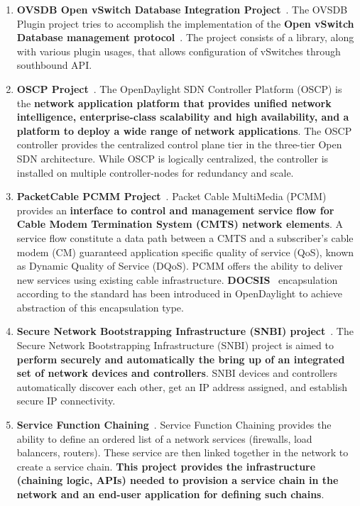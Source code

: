 \documentclass[a4paper, 12pt]{book}
\begin{document}
\begin{enumerate}
\item{\textbf{OVSDB Open vSwitch Database Integration Project}}~\cite{OpenDaylightWikiOpFlex}. The OVSDB Plugin project tries to accomplish the implementation of the \textbf{Open vSwitch Database management protocol}~\cite{OVSDB}. The project consists of a library, along with various plugin usages, that allows configuration of vSwitches through southbound API.
\item{\textbf{OSCP Project}}~\cite{OpenDaylightWikiOSCP}. The OpenDaylight SDN Controller Platform (OSCP) is the \textbf{network application platform that provides unified network intelligence, enterprise-class scalability and high availability, and a platform to deploy a wide range of network applications}. The OSCP controller provides the centralized control plane tier in the three-tier Open SDN architecture. While OSCP is logically centralized, the controller is installed on multiple controller-nodes for redundancy and scale.
\item{\textbf{PacketCable PCMM Project}}~\cite{OpenDaylightWikiPacketCable}. Packet Cable MultiMedia (PCMM)~\cite{PCMM} provides an \textbf{interface to control and management service flow for Cable Modem Termination System (CMTS) network elements}. A service flow constitute a data path between a CMTS and a subscriber's cable modem (CM) guaranteed application specific quality of service (QoS), known as Dynamic Quality of Service (DQoS). PCMM offers the ability to deliver new services using existing cable infrastructure. \textbf{DOCSIS}~\cite{DOCSIS} encapsulation according to the standard has been introduced in OpenDaylight to achieve abstraction of this encapsulation type.
\item{\textbf{Secure Network Bootstrapping Infrastructure (SNBI) project}}~\cite{OpenDaylightWikiSNBI}.  The Secure Network Bootstrapping Infrastructure (SNBI) project is aimed to \textbf{perform securely and automatically the bring up of an integrated set of network devices and controllers}. SNBI devices and controllers automatically discover each other, get an IP address assigned, and establish secure IP connectivity.
\item{\textbf{Service Function Chaining}}~\cite{OpenDaylightWikiSNMP}. Service Function Chaining provides the ability to define an ordered list of a network services (firewalls, load balancers, routers). These service are then linked together in the network to create a service chain. \textbf{This project provides the infrastructure (chaining logic, APIs) needed to provision a service chain in the network and an end-user application for defining such chains}.

\end{enumerate}
\end{document}
